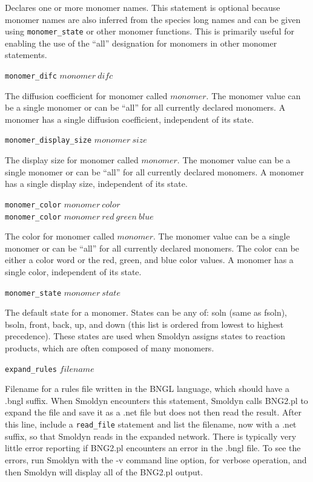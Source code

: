 \documentclass {scrbook}
\newcommand {\ttt} {\texttt}
\begin{document}
\begin{description}
Declares one or more monomer names. This statement is optional because monomer names are also inferred from the species long names and can be given using \ttt{monomer\_state} or other monomer functions. This is primarily useful for enabling the use of the ``all'' designation for monomers in other monomer statements.

\item{\ttt{monomer\_difc} $monomer\ difc$}

The diffusion coefficient for monomer called $monomer$. The monomer value can be a single monomer or can be ``all'' for all currently declared monomers. A monomer has a single diffusion coefficient, independent of its state.

\item{\ttt{monomer\_display\_size} $monomer\ size$}

The display size for monomer called $monomer$. The monomer value can be a single monomer or can be ``all'' for all currently declared monomers. A monomer has a single display size, independent of its state.

\item{\ttt{monomer\_color} $monomer\ color$\\
\ttt{monomer\_color} $monomer\ red\ green\ blue$}

The color for monomer called $monomer$. The monomer value can be a single monomer or can be ``all'' for all currently declared monomers. The color can be either a color word or the red, green, and blue color values. A monomer has a single color, independent of its state.

\item{\ttt{monomer\_state} $monomer\ state$}

The default state for a monomer. States can be any of: soln (same as fsoln), bsoln, front, back, up, and down (this list is ordered from lowest to highest precedence). These states are used when Smoldyn assigns states to reaction products, which are often composed of many monomers.

\item{\ttt{expand\_rules} $filename$}

Filename for a rules file written in the BNGL language, which should have a .bngl suffix. When Smoldyn encounters this statement, Smoldyn calls BNG2.pl to expand the file and save it as a .net file but does not then read the result. After this line, include a \ttt{read\_file} statement and list the filename, now with a .net suffix, so that Smoldyn reads in the expanded network. There is typically very little error reporting if BNG2.pl encounters an error in the .bngl file. To see the errors, run Smoldyn with the -v command line option, for verbose operation, and then Smoldyn will display all of the BNG2.pl output.

\end{description}
\end{document}
